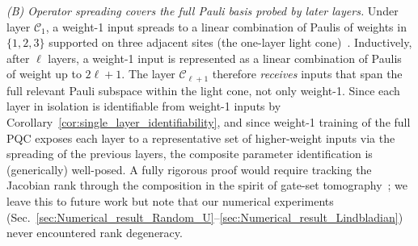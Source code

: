 \documentclass[%
 reprint,
superscriptaddress,
 amsmath,amssymb,
 aps,
]{revtex4-2}
\begin{document}
\emph{(B) Operator spreading covers the full Pauli basis probed by later layers.}
Under layer $\mathcal{C}_1$, a weight-1 input spreads to a linear combination of Paulis of weights in $\{1,2,3\}$ supported on three adjacent sites (the one-layer light cone)~\cite{nahum2018operator,vonKeyserlingk2018operatorhydrodynamics}. Inductively, after $\ell$ layers, a weight-1 input is represented as a linear combination of Paulis of weight up to $2\ell+1$. The layer $\mathcal{C}_{\ell+1}$ therefore \emph{receives} inputs that span the full relevant Pauli subspace within the light cone, not only weight-1. Since each layer in isolation is identifiable from weight-1 inputs by Corollary~\ref{cor:single_layer_identifiability}, and since weight-1 training of the full PQC exposes each layer to a representative set of higher-weight inputs via the spreading of the previous layers, the composite parameter identification is (generically) well-posed. A fully rigorous proof would require tracking the Jacobian rank through the composition in the spirit of gate-set tomography~\cite{greenbaum2015gst}; we leave this to future work but note that our numerical experiments (Sec.~\ref{sec:Numerical_result_Random_U}--\ref{sec:Numerical_result_Lindbladian}) never encountered rank degeneracy.
\end{document}
